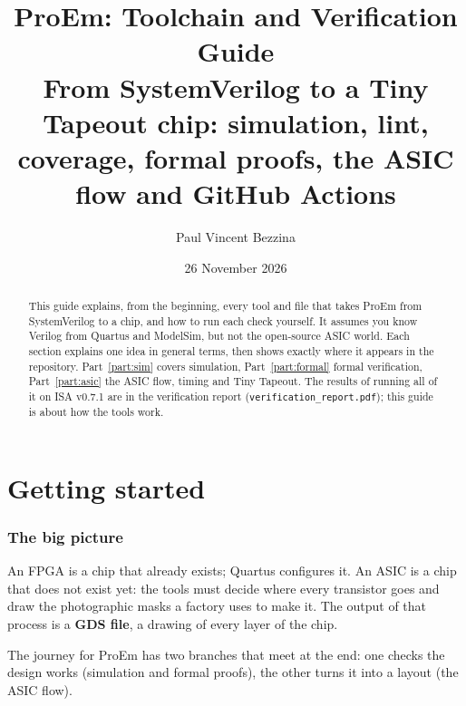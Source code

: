 \documentclass[11pt,a4paper]{article}
\title{\color{accent}\textbf{ProEm: Toolchain and Verification Guide}\\[4pt]
\large From SystemVerilog to a Tiny Tapeout chip: simulation, lint, coverage, formal proofs, the ASIC flow and GitHub Actions}
\author{Paul Vincent Bezzina}
\date{26 November 2026}
\newcommand{\file}[1]{\texttt{#1}}
\begin{document}
\maketitle

\begin{abstract}
This guide explains, from the beginning, every tool and file that takes ProEm from SystemVerilog to a chip, and how to run each check yourself. It assumes you know Verilog from Quartus and ModelSim, but not the open-source ASIC world. Each section explains one idea in general terms, then shows exactly where it appears in the repository. Part~\ref{part:sim} covers simulation, Part~\ref{part:formal} formal verification, Part~\ref{part:asic} the ASIC flow, timing and Tiny Tapeout. The results of running all of it on ISA v0.7.1 are in the verification report (\file{verification\_report.pdf}); this guide is about how the tools work.
\end{abstract}

\tableofcontents
\newpage

\part{Getting started}

\section{The big picture}

An FPGA is a chip that already exists; Quartus configures it. An ASIC is a chip that does not exist yet: the tools must decide where every transistor goes and draw the photographic masks a factory uses to make it. The output of that process is a \textbf{GDS file}, a drawing of every layer of the chip.

The journey for ProEm has two branches that meet at the end: one checks the design works (simulation and formal proofs), the other turns it into a layout (the ASIC flow).
\end{document}
